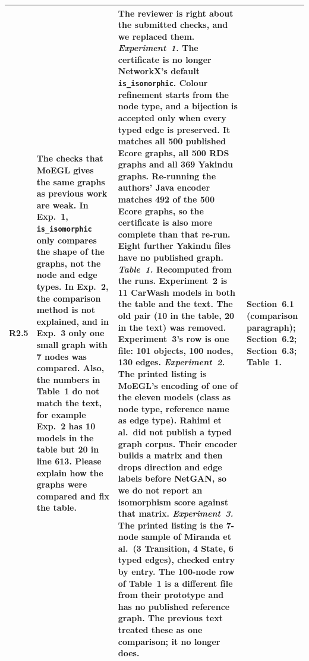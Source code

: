 \documentclass[11pt,a4paper]{article}
\begin{document}
\begin{longtable}{@{}P{1.0cm}P{4.3cm}P{5.9cm}P{3.9cm}@{}}
R2.5 &
The checks that MoEGL gives the same graphs as previous work are weak. In Exp.~1, \texttt{is\_isomorphic} only compares the shape of the graphs, not the node and edge types. In Exp.~2, the comparison method is not explained, and in Exp.~3 only one small graph with 7 nodes was compared. Also, the numbers in Table~1 do not match the text, for example Exp.~2 has 10 models in the table but 20 in line 613. Please explain how the graphs were compared and fix the table. &
The reviewer is right about the submitted checks, and we replaced them.
\emph{Experiment~1.} The certificate is no longer NetworkX's default \texttt{is\_isomorphic}. Colour refinement starts from the node type, and a bijection is accepted only when every typed edge is preserved. It matches all 500 published Ecore graphs, all 500 RDS graphs and all 369 Yakindu graphs. Re-running the authors' Java encoder matches 492 of the 500 Ecore graphs, so the certificate is also more complete than that re-run. Eight further Yakindu files have no published graph.
\emph{Table~1.} Recomputed from the runs. Experiment~2 is 11 CarWash models in both the table and the text. The old pair (10 in the table, 20 in the text) was removed. Experiment~3's row is one file: 101 objects, 100 nodes, 130 edges.
\emph{Experiment~2.} The printed listing is MoEGL's encoding of one of the eleven models (class as node type, reference name as edge type). Rahimi et al.\ did not publish a typed graph corpus. Their encoder builds a matrix and then drops direction and edge labels before NetGAN, so we do not report an isomorphism score against that matrix.
\emph{Experiment~3.} The printed listing is the 7-node sample of Miranda et al.\ (3 Transition, 4 State, 6 typed edges), checked entry by entry. The 100-node row of Table~1 is a different file from their prototype and has no published reference graph. The previous text treated these as one comparison; it no longer does. &
Section~6.1 (comparison paragraph); Section~6.2; Section~6.3; Table~1. \\
\midrule


\end{longtable}
\end{document}

